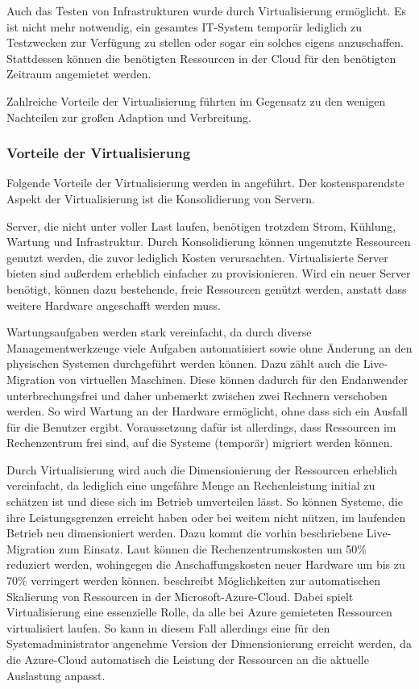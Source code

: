Auch das Testen von Infrastrukturen wurde durch Virtualisierung ermöglicht.
Es ist nicht mehr notwendig, ein gesamtes IT-System temporär lediglich zu Testzwecken zur Verfügung zu stellen oder sogar ein solches eigens anzuschaffen.
Stattdessen können die benötigten Ressourcen in der Cloud für den benötigten Zeitraum angemietet werden.

Zahlreiche Vorteile der Virtualisierung führten im Gegensatz zu den wenigen Nachteilen zur großen Adaption und Verbreitung.

\subsubsection{Vorteile der Virtualisierung}
Folgende Vorteile der Virtualisierung werden in \autocite{Baun2009} angeführt.
Der kostensparendste Aspekt der Virtualisierung ist die Konsolidierung von Servern.

Server, die nicht unter voller Last laufen, benötigen trotzdem Strom, Kühlung, Wartung und Infrastruktur.
Durch Konsolidierung können ungenutzte Ressourcen genutzt werden, die zuvor lediglich Kosten verursachten.
Virtualisierte Server bieten sind außerdem erheblich einfacher zu provisionieren.
Wird ein neuer Server benötigt, können dazu bestehende, freie Ressourcen genützt werden, anstatt dass weitere Hardware angeschafft werden muss.

Wartungsaufgaben werden stark vereinfacht, da durch diverse Managementwerkzeuge viele Aufgaben automatisiert sowie ohne Änderung an den physischen Systemen durchgeführt werden können.
Dazu zählt auch die Live-Migration von virtuellen Maschinen.
Diese können dadurch für den Endanwender unterbrechungsfrei und daher unbemerkt zwischen zwei Rechnern verschoben werden.
So wird Wartung an der Hardware ermöglicht, ohne dass sich ein Ausfall für die Benutzer ergibt.
Voraussetzung dafür ist allerdings, dass Ressourcen im Rechenzentrum frei sind, auf die Systeme (temporär) migriert werden können.

Durch Virtualisierung wird auch die Dimensionierung der Ressourcen erheblich vereinfacht, da lediglich eine ungefähre Menge an Rechenleistung initial zu schätzen ist und diese sich im Betrieb umverteilen lässt.
So können Systeme, die ihre Leistungsgrenzen erreicht haben oder bei weitem nicht nützen, im laufenden Betrieb neu dimensioniert werden.
Dazu kommt die vorhin beschriebene Live-Migration zum Einsatz.
Laut \autocite{Hantelmann2008} können die Rechenzentrumskosten um 50\% reduziert werden, wohingegen die Anschaffungskosten neuer Hardware um bis zu 70\% verringert werden können.
\autocite{Azure-Scaling:online} beschreibt Möglichkeiten zur automatischen Skalierung von Ressourcen in der Microsoft-Azure-Cloud.
Dabei spielt Virtualisierung eine essenzielle Rolle, da alle bei Azure gemieteten Ressourcen virtualisiert laufen.
So kann in diesem Fall allerdings eine für den Systemadministrator angenehme Version der Dimensionierung erreicht werden, da die Azure-Cloud automatisch die Leistung der Ressourcen an die aktuelle Auslastung anpasst.

